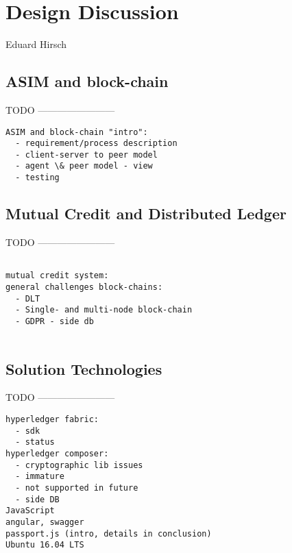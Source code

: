 \chapter{Design Discussion}
\label{ch:design}

\vspace{-1cm}
\begin{center}
Eduard Hirsch
\end{center}

\section{ASIM and block-chain}
\label{sec:asim}

TODO ------------------------

\begin{verbatim}
ASIM and block-chain "intro":
  - requirement/process description
  - client-server to peer model
  - agent \& peer model - view 
  - testing
\end{verbatim}

\section{Mutual Credit and Distributed Ledger}
\label{sec:dlt} 

TODO ------------------------

\begin{verbatim}

mutual credit system:
general challenges block-chains:
  - DLT
  - Single- and multi-node block-chain
  - GDPR - side db
  
\end{verbatim}
  
\section{Solution Technologies}
\label{sec:solution}

TODO ------------------------

\begin{verbatim}
hyperledger fabric:
  - sdk
  - status
hyperledger composer:
  - cryptographic lib issues
  - immature
  - not supported in future
  - side DB
JavaScript
angular, swagger
passport.js (intro, details in conclusion)
Ubuntu 16.04 LTS
\end{verbatim}